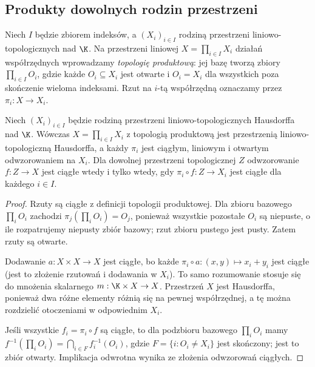 \subsection{Produkty dowolnych rodzin przestrzeni}

\begin{definicja}
Niech $I$ będzie zbiorem indeksów, a $(X_i)_{i\in I}$ rodziną
przestrzeni liniowo-topologicznych nad $\K$. Na przestrzeni
liniowej $X=\prod_{i\in I}X_i$ działań współrzędnych
wprowadzamy \emph{topologię produktową}: jej bazę tworzą zbiory
$\prod_{i\in I}O_i$, gdzie każde $O_i\subseteq X_i$ jest
otwarte i $O_i=X_i$ dla wszystkich poza skończenie wieloma
indeksami. Rzut na $i$-tą współrzędną oznaczamy przez
$\pi_i:X\to X_i$.
\end{definicja}

\begin{twierdzenie}\label{thm:product-tvs}
Niech $(X_i)_{i\in I}$ będzie rodziną przestrzeni
liniowo-topologicznych Hausdorffa nad $\K$.
Wówczas $X=\prod_{i\in I}X_i$ z topologią produktową
jest przestrzenią liniowo-topologiczną Hausdorffa, a każdy
$\pi_i$ jest ciągłym, liniowym i otwartym odwzorowaniem na $X_i$.
Dla dowolnej przestrzeni topologicznej $Z$ odwzorowanie
$f:Z\to X$ jest ciągłe wtedy i tylko wtedy, gdy
$\pi_i\circ f:Z\to X_i$ jest ciągłe dla każdego $i\in I$.
\end{twierdzenie}
\begin{proof}
Rzuty są ciągłe z definicji topologii produktowej. Dla zbioru
bazowego $\prod_i O_i$ zachodzi $\pi_j(\prod_i O_i)=O_j$,
ponieważ wszystkie pozostałe $O_i$ są niepuste, o ile
rozpatrujemy niepusty zbiór bazowy; rzut zbioru pustego
jest pusty. Zatem rzuty są otwarte.

Dodawanie $a:X\times X\to X$ jest ciągłe, bo każde
$\pi_i\circ a:(x,y)\mapsto x_i+y_i$ jest ciągłe
(jest to złożenie rzutowań i dodawania w $X_i$).
To samo rozumowanie stosuje się do mnożenia skalarnego
$m:\K\times X\to X$. Przestrzeń $X$ jest Hausdorffa,
ponieważ dwa różne elementy różnią się na pewnej współrzędnej,
a tę można rozdzielić otoczeniami w odpowiednim $X_i$.

Jeśli wszystkie $f_i=\pi_i\circ f$ są ciągłe,
to dla podzbioru bazowego $\prod_iO_i$ mamy
$f^{-1}(\prod_iO_i)=\bigcap_{i\in F}f_i^{-1}(O_i)$,
gdzie $F=\{i:O_i\ne X_i\}$ jest skończony;
jest to zbiór otwarty. Implikacja odwrotna wynika
ze złożenia odwzorowań ciągłych.
\end{proof}

